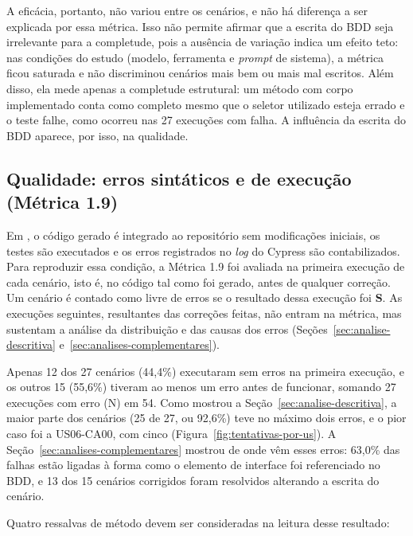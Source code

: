 A eficácia, portanto, não variou entre os cenários, e não há diferença a ser explicada por essa métrica. Isso não permite afirmar que a escrita do BDD seja irrelevante para a completude, pois a ausência de variação indica um efeito teto: nas condições do estudo (modelo, ferramenta e \textit{prompt} de sistema), a métrica ficou saturada e não discriminou cenários mais bem ou mais mal escritos. Além disso, ela mede apenas a completude estrutural: um método com corpo implementado conta como completo mesmo que o seletor utilizado esteja errado e o teste falhe, como ocorreu nas 27 execuções com falha. A influência da escrita do BDD aparece, por isso, na qualidade.

\subsection{Qualidade: erros sintáticos e de execução (Métrica 1.9)}
\label{subsec:qualidade}

Em , o código gerado é integrado ao repositório sem modificações iniciais, os testes são executados e os erros registrados no \textit{log} do Cypress são contabilizados. Para reproduzir essa condição, a Métrica 1.9 foi avaliada na primeira execução de cada cenário, isto é, no código tal como foi gerado, antes de qualquer correção. Um cenário é contado como livre de erros se o resultado dessa execução foi \textbf{S}. As execuções seguintes, resultantes das correções feitas, não entram na métrica, mas sustentam a análise da distribuição e das causas dos erros (Seções~\ref{sec:analise-descritiva} e~\ref{sec:analises-complementares}).

Apenas 12 dos 27 cenários (44,4\%) executaram sem erros na primeira execução, e os outros 15 (55,6\%) tiveram ao menos um erro antes de funcionar, somando 27 execuções com erro (N) em 54. Como mostrou a Seção~\ref{sec:analise-descritiva}, a maior parte dos cenários (25 de 27, ou 92,6\%) teve no máximo dois erros, e o pior caso foi a US06-CA00, com cinco (Figura~\ref{fig:tentativas-por-us}). A Seção~\ref{sec:analises-complementares} mostrou de onde vêm esses erros: 63,0\% das falhas estão ligadas à forma como o elemento de interface foi referenciado no BDD, e 13 dos 15 cenários corrigidos foram resolvidos alterando a escrita do cenário.

Quatro ressalvas de método devem ser consideradas na leitura desse resultado:

